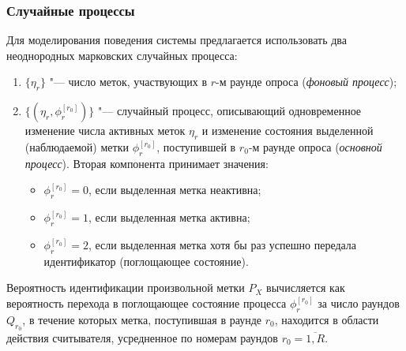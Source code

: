 \begin{frame}
    \frametitle{Случайные процессы}
    Для моделирования поведения системы предлагается использовать два неоднородных марковских случайных процесса:
    \small
    \begin{enumerate}
        \item $\{ \eta_r \}$ "--- число меток, участвующих в $r$-м раунде опроса (\textit{фоновый процесс});
        \item $\{( \eta_r, \phi_r^{[r_0]} )\}$ "--- случайный процесс, описывающий одновременное изменение числа активных меток $\eta_r$ и изменение состояния выделенной (наблюдаемой) метки $\phi_r^{[r_0]}$, поступившей в $r_0$-м раунде опроса (\textit{основной процесс}). Вторая компонента принимает значения:
        \footnotesize
        \begin{itemize}
            \item $\phi_r^{[r_0]} = 0$, если выделенная метка неактивна;
            \item $\phi_r^{[r_0]} = 1$, если выделенная метка активна;
            \item $\phi_r^{[r_0]} = 2$, если выделенная метка хотя бы раз успешно передала идентификатор (поглощающее состояние).
        \end{itemize}
    \end{enumerate}
    \begin{block}{}
        \small
        Вероятность идентификации произвольной метки $P_X$ вычисляется как вероятность перехода в поглощающее состояние процесса $\phi_r^{[r_0]}$ за число раундов $Q_{r_0}$, в течение которых метка, поступившая в раунде $r_0$, находится в области действия считывателя, усредненное по номерам раундов $r_0 = \overline{1, R}$.
    \end{block}
\end{frame}

